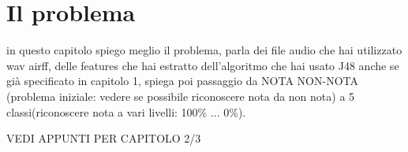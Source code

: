 \chapter{Il problema}
in questo capitolo spiego meglio il problema, parla dei file audio che hai utilizzato wav  airff, delle features che hai estratto dell'algoritmo che hai usato J48 anche se già specificato in capitolo 1,  spiega poi passaggio da NOTA NON-NOTA (problema iniziale: vedere se possibile riconoscere nota da non nota) a 5 classi(riconoscere nota a vari livelli: 100\% ... 0\%). 

VEDI APPUNTI PER CAPITOLO 2/3